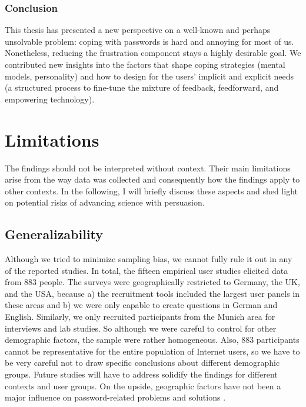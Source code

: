 \subsubsection{Conclusion}
This thesis has presented a new perspective on a well-known and perhaps unsolvable problem: coping with passwords is hard and annoying for most of us. Nonetheless, reducing the frustration component stays a highly desirable goal. We contributed new insights into the factors that shape coping strategies (mental models, personality) and how to design for the users' implicit and explicit needs (a structured process to fine-tune the mixture of feedback, feedforward, and empowering technology). 

\section{Limitations}
The findings should not be interpreted without context. Their main limitations arise from the way data was collected and consequently how the findings apply to other contexts. In the following, I will briefly discuss these aspects and shed light on potential risks of advancing science with persuasion. 

\subsection{Generalizability}
Although we tried to minimize sampling bias, we cannot fully rule it out in any of the reported studies. In total, the fifteen empirical user studies elicited data from 883 people. The surveys were geographically restricted to Germany, the UK, and the USA, because a) the recruitment tools included the largest user panels in these areas and b) we were only capable to create questions in German and English. Similarly, we only recruited participants from the Munich area for interviews and lab studies. So although we were careful to control for other demographic factors, the sample were rather homogeneous. Also, 883 participants cannot be representative for the entire population of Internet users, so we have to be very careful not to draw specific conclusions about different demographic groups. Future studies will have to address solidify the findings for different contexts and user groups. On the upside, geographic factors have not been a major influence on password-related problems and solutions \cite{Violettas2014PasswordsAvoidGreece, Wang2015ChinesePWs}. 


